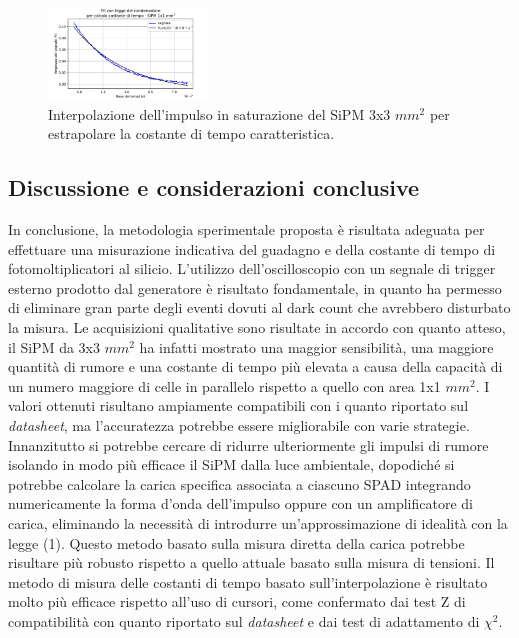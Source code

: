 \documentclass[journal]{IEEEtran}
\begin{document}
\begin{figure}[H]%
\begin{center}
\includegraphics[width=0.38\textwidth]{analysis/output/SiPM_fit_1mm.pdf}
\caption{Interpolazione dell'impulso in saturazione del SiPM 3x3 $mm^2$ per estrapolare la costante di tempo caratteristica.}
\label{fig:fit3m}
\end{center}
\end{figure}

\subsection{Discussione e considerazioni conclusive}
In conclusione, la metodologia sperimentale proposta è risultata adeguata per effettuare una misurazione indicativa del guadagno e della costante di tempo di fotomoltiplicatori al silicio. L'utilizzo dell'oscilloscopio con un segnale di trigger esterno prodotto dal generatore è risultato fondamentale, in quanto ha permesso di eliminare gran parte degli eventi dovuti al dark count che avrebbero disturbato la misura. Le acquisizioni qualitative sono risultate in accordo con quanto atteso, il SiPM da 3x3 $mm^2$ ha infatti mostrato una maggior sensibilità, una maggiore quantità di rumore e una costante di tempo più elevata a causa della capacità di un numero maggiore di celle in parallelo  rispetto a quello con area 1x1 $mm^2$. I valori ottenuti risultano ampiamente compatibili con i quanto riportato sul \textit{datasheet}, ma l'accuratezza potrebbe essere migliorabile con varie strategie. Innanzitutto si potrebbe cercare di ridurre ulteriormente gli impulsi di rumore isolando in modo più efficace il SiPM dalla luce ambientale, dopodiché si potrebbe calcolare la carica specifica associata a ciascuno SPAD integrando numericamente la forma d'onda dell'impulso oppure con un amplificatore di carica, eliminando la necessità di introdurre un'approssimazione di idealità con la legge (1). Questo metodo basato sulla misura diretta della carica potrebbe risultare più robusto rispetto a quello attuale basato sulla misura di tensioni. Il metodo di misura delle costanti di tempo basato sull'interpolazione è risultato molto più efficace rispetto all'uso di cursori, come confermato dai test Z di compatibilità con quanto riportato sul \textit{datasheet} e dai test di adattamento di $\chi^2$.
\end{document}
